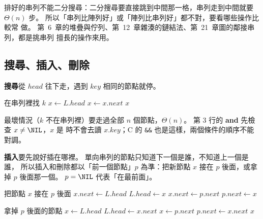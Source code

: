 排好的串列不能二分搜尋：二分搜尋要直接跳到中間那一格，串列走到中間就要
$\Theta(n)$ 步。 所以「串列比陣列好」或「陣列比串列好」都不對，要看哪些操作比較常
做。 第~6~章的堆疊與佇列、第~12~章雜湊的鏈結法、第~21~章圖的鄰接串列，都是挑串列
擅長的操作來用。

\subsection{搜尋、插入、刪除}

\textbf{搜尋}從 $\mathit{head}$ 往下走，遇到 $\mathit{key}$ 相同的節點就停。

\begin{pseudo}[label=alg:ll-search]{在串列裡找 $k$}
    \State $x \gets L.\mathit{head}$
        \State $x \gets x.\mathit{next}$
    \EndWhile
    \State \Return $x$ 
\EndFunction
\end{pseudo}

最壞情況（$k$ 不在串列裡）要走過全部 $n$ 個節點，$\Theta(n)$。 第 3 行的
\textbf{and} 先檢查 $x \ne \NIL$，$x$ 是 \NIL 時不會去讀 $x.\mathit{key}$；C 的
\texttt{\&\&} 也是這樣，兩個條件的順序不能對調。

\textbf{插入}要先說好插在哪裡。 單向串列的節點只知道下一個是誰，不知道上一個是誰，
所以插入和刪除都以「前一個節點」$p$ 為準：把新節點 $x$ 接在 $p$ 後面，或拿掉 $p$
後面那一個。 $p = \NIL$ 代表「在最前面」。

\begin{pseudo}[label=alg:ll-insert]{把節點 $x$ 接在 $p$ 後面}
     
        \State $x.\mathit{next} \gets L.\mathit{head}$
        \State $L.\mathit{head} \gets x$
    \Else
        \State $x.\mathit{next} \gets p.\mathit{next}$
        \State $p.\mathit{next} \gets x$
    \EndIf
\EndProcedure
\end{pseudo}

\begin{pseudo}[label=alg:ll-delete]{拿掉 $p$ 後面的節點}
     
        \State $x \gets L.\mathit{head}$
        \State $L.\mathit{head} \gets x.\mathit{next}$
    \Else
        \State $x \gets p.\mathit{next}$
        \State $p.\mathit{next} \gets x.\mathit{next}$
    \EndIf
    \State \Return $x$ 
\EndFunction
\end{pseudo}

